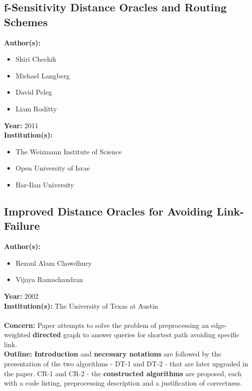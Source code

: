 \documentclass[a4paper]{article}
\newenvironment{itemizesp}
{
    \begin{itemize}
}
{
    \end{itemize}
}
\newcommand{\textbff}[1]{{\large \textbf{#1}}}
\begin{document}
        \subsection{f-Sensitivity Distance Oracles and Routing Schemes}
        \label{subsec:fsensitivity}

        \textbff{Author(s): }
        \begin{itemizesp}
            \item Shiri Chechik
            \item Michael Langberg
            \item David Peleg
            \item Liam Roditty
        \end{itemizesp}
        \textbff{Year: }2011 \\
        \textbff{Institution(s): }
        \begin{itemizesp}
            \item The Weizmann Institute of Science
            \item Open University of Israe
            \item Bar-Ilan University
        \end{itemizesp}

        \subsection{Improved Distance Oracles for Avoiding Link-Failure}
        \label{subsec:linkfailure}

        \textbff{Author(s): }
        \begin{itemizesp}
            \item Rezaul Alam Chowdhury
            \item Vijaya Ramachandran
        \end{itemizesp}
        \textbff{Year: }2002 \\
        \textbff{Institution(s): } The University of Texas at Austin \\
        \hspace*{\fill}\\
        \textbff{Concern:} Paper attempts to solve the problem of preprocessing an edge-weighted \textbf{directed} graph to answer queries for shortest path avoiding specific link. \\

        \textbff{Outline:} \textbf{Introduction }and \textbf{necessary notations} are followed by the presentation of the two algorithms - DT-1 and DT-2 - that are later upgraded in the paper. CR-1 and CR-2 - the \textbf{constructed algorithms} are proposed, each with a code listing, preprocessing description and a justification of correctness. \\
\end{document}
